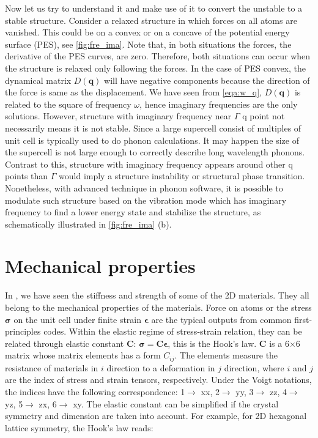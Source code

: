 Now let us try to understand it and make use of it to convert the unstable to a stable structure. Consider a relaxed structure in which forces on all atoms are vanished. This could be on a convex or on a concave of the potential energy surface (PES), see \autoref{fig:fre_ima}. Note that, in both situations the forces, the derivative of the PES curves, are zero. Therefore, both situations can occur when the structure is relaxed only following the forces. In the case of PES convex, the dynamical matrix $D(\mathbf{q})$ will have negative components because the direction of the force is same as the displacement. We have seen from \autoref{eqa:w_q}, $D(\mathbf{q})$ is related to the square of frequency $\omega$, hence imaginary frequencies are the only solutions. However, structure with imaginary frequency near $\Gamma$ q point not necessarily means it is not stable. Since a large supercell consist of multiples of unit cell is typically used to do phonon calculations. It may happen the size of the supercell is not large enough to correctly describe long wavelength phonons. Contrast to this, structure with imaginary frequency appears around other q points than $\Gamma$ would imply a structure instability or structural phase transition. Nonetheless, with advanced technique in phonon software\cite{Togo20151}, it is possible to modulate such structure based on the vibration mode which has imaginary frequency to find a lower energy state and stabilize the structure, as schematically illustrated in \autoref{fig:fre_ima} (b). 



\section{Mechanical properties}

In , we have seen the stiffness and strength of some of the 2D materials. They all belong to the mechanical properties of the materials. Force on atoms or the stress $\boldsymbol{\sigma}$ on the unit cell under finite strain $\boldsymbol{\epsilon}$ are the typical outputs from common first-principles codes. Within the elastic regime of stress-strain relation, they can be related through elastic constant $\boldsymbol{C}$: $\boldsymbol{\sigma}=\boldsymbol{C}\boldsymbol{\epsilon}$, this is the Hook's law. $\boldsymbol{C}$ is a 6$\times$6 matrix whose matrix elements has a form $C_{ij}$. The elements measure the resistance of materials in $i$ direction to a deformation in $j$ direction, where $i$ and $j$ are the index of stress and strain tensors, respectively.  Under the Voigt notations, the indices have the following correspondence: 1$\rightarrow$ xx, 2$\rightarrow$ yy, 3$\rightarrow$ zz, 4$\rightarrow$ yz, 5$\rightarrow$ zx, 6$\rightarrow$ xy. The elastic constant can be simplified if the crystal symmetry and dimension are taken into account. For example, for 2D hexagonal lattice symmetry, the Hook's law reads:

